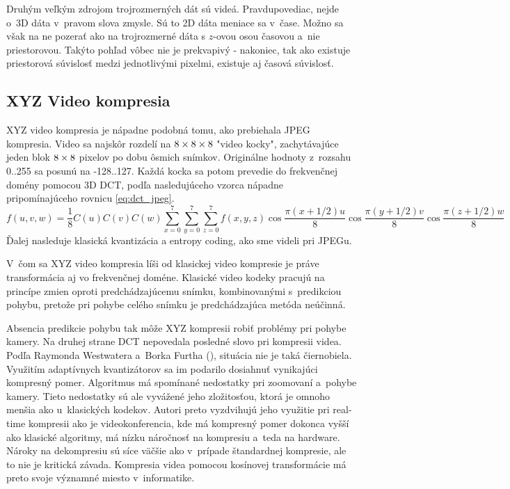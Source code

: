 Druhým veľkým zdrojom trojrozmerných dát sú videá. Pravdupovediac,
nejde o~3D dáta v~pravom slova zmysle. Sú to 2D dáta meniace sa v~čase.
Možno sa však na ne pozerať ako na trojrozmerné dáta s $z$-ovou osou časovou 
a~nie priestorovou. Takýto pohľad vôbec nie je prekvapivý - nakoniec,
tak ako existuje priestorová súvislosť medzi jednotlivými pixelmi,
existuje aj časová súvislosť.

\subsection{XYZ Video kompresia}
XYZ video kompresia je nápadne podobná tomu, ako prebiehala JPEG
kompresia. Video sa najskôr rozdelí na $8\times8\times8$ "video kocky",
zachytávajúce jeden blok $8\times8$ pixelov po dobu ôsmich snímkov.
Originálne hodnoty z~rozsahu 0..255 sa posunú na -128..127.
Každá kocka sa potom prevedie do frekvenčnej domény pomocou 3D DCT,
podľa nasledujúceho vzorca nápadne pripomínajúceho rovnicu
\eqref{eq:dct_jpeg}.
\begin{equation*}
   f(u,v,w) = \frac{1}{8} C(u) C(v) C(w)
    \sum_{x=0}^7 \sum_{y=0}^7 \sum_{z=0}^7 f(x,y,z)
        \cos\frac{\pi(x+1/2) u }{8}
        \cos\frac{\pi(y+1/2) v }{8}
        \cos\frac{\pi(z+1/2) w }{8}
\end{equation*}
Ďalej nasleduje klasická kvantizácia a entropy coding, ako sme
videli pri JPEGu.

V~čom sa XYZ video kompresia líši od klasickej video kompresie je
práve transformácia aj vo frekvenčnej doméne. Klasické video kodeky
pracujú na princípe zmien oproti predchádzajúcemu snímku,
kombinovanými s~predikciou pohybu, pretože pri pohybe celého
snímku je predchádzajúca metóda neúčinná.

Absencia predikcie pohybu tak môže XYZ kompresii robiť problémy pri
pohybe kamery. Na druhej strane DCT nepovedala posledné slovo pri
kompresii videa. Podľa Raymonda Westwatera a~Borka Furtha 
(\cite{3ddct_adaptive}), situácia nie je taká
čiernobiela. Využitím adaptívnych kvantizátorov sa im podarilo
dosiahnuť vynikajúci kompresný pomer. Algoritmus má spomínané
nedostatky pri zoomovaní a~pohybe kamery. Tieto nedostatky sú ale
vyvážené jeho zložitosťou, ktorá je omnoho menšia ako u~klasických
kodekov. Autori preto vyzdvihujú jeho využitie pri real-time kompresii
ako je videokonferencia, kde má kompresný pomer dokonca vyšší ako
klasické algoritmy, má nízku náročnosť na kompresiu a~teda na
hardware. Nároky na dekompresiu sú síce väčšie ako v~prípade
štandardnej kompresie, ale to nie je kritická závada. Kompresia videa
pomocou kosínovej transformácie má preto svoje významné miesto 
v~informatike.

\nocite{video_compression}
